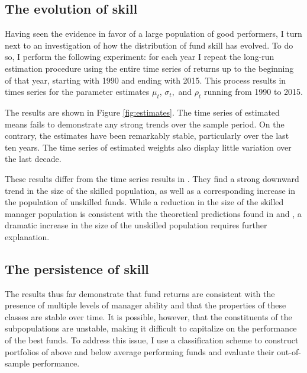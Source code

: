 	\subsection{The evolution of skill}
		Having seen the evidence in favor of a large population of good performers, I turn next to an investigation of how the distribution of fund skill has evolved. To do so, I perform the following experiment: for each year I repeat the long-run estimation procedure using the entire time series of returns up to the beginning of that year, starting with 1990 and ending with 2015. This process results in times series for the parameter estimates $\mu_t$, $\sigma_t,$ and $\rho_t$ running from 1990 to 2015.

		The results are shown in Figure \ref{fig:estimates}. The time series of estimated means fails to demonstrate any strong trends over the sample period. On the contrary, the estimates have been remarkably stable, particularly over the last ten years. The time series of estimated weights also display little variation over the last decade.

		These results differ from the time series results in \citet{Barras2010}.  They find a strong downward trend in the size of the skilled population, as well as a corresponding increase in the population of unskilled funds.  While a reduction in the size of the skilled manager population is consistent with the theoretical predictions found in \citet{Berk2004} and \citet{Pastor2012}, a dramatic increase in the size of the unskilled population requires further explanation.

	\subsection{The persistence of skill}
		The results thus far demonstrate that fund returns are consistent with the presence of multiple levels of manager ability and that the properties of these classes are stable over time. It is possible, however, that the constituents of the subpopulations are unstable, making it difficult to capitalize on the performance of the best funds. To address this issue, I use a classification scheme to construct portfolios of above and below average performing funds and evaluate their out-of-sample performance.

